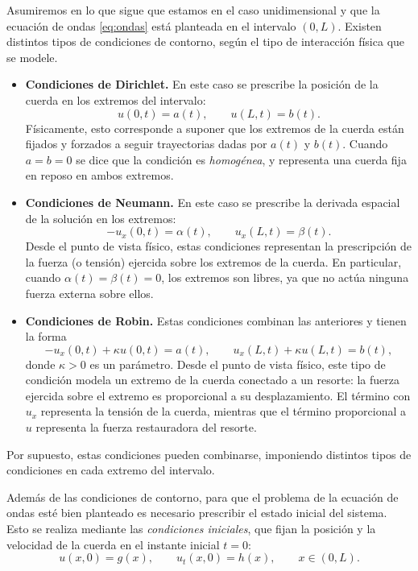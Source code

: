 \documentclass[12pt, a4paper]{amsbook}
\theoremstyle{remark}
\theoremstyle{definition}
\numberwithin{section}{chapter}
\numberwithin{subsection}{section}
\numberwithin{equation}{section}
\numberwithin{figure}{chapter}
\begin{document}
Asumiremos en lo que sigue que estamos en el caso unidimensional y que la ecuación de ondas \eqref{eq:ondas} está planteada en el intervalo $(0,L)$. Existen distintos tipos de condiciones de contorno, según el tipo de interacción física que se modele.

\begin{itemize}
\item \textbf{Condiciones de Dirichlet.}  
En este caso se prescribe la posición de la cuerda en los extremos del intervalo:
\[
u(0,t)=a(t), \qquad u(L,t)=b(t).
\]
Físicamente, esto corresponde a suponer que los extremos de la cuerda están fijados y forzados a seguir trayectorias dadas por $a(t)$ y $b(t)$.  
Cuando $a=b=0$ se dice que la condición es \emph{homogénea}, y representa una cuerda fija en reposo en ambos extremos.

\item \textbf{Condiciones de Neumann.}  
En este caso se prescribe la derivada espacial de la solución en los extremos:
\[
- u_x(0,t) = \alpha(t), \qquad u_x(L,t) = \beta(t).
\]
Desde el punto de vista físico, estas condiciones representan la prescripción de la fuerza (o tensión) ejercida sobre los extremos de la cuerda. En particular, cuando $\alpha(t)=\beta(t)=0$, los extremos son libres, ya que no actúa ninguna fuerza externa sobre ellos.

\item \textbf{Condiciones de Robin.}  
Estas condiciones combinan las anteriores y tienen la forma
\[
- u_x(0,t) + \kappa u(0,t) = a(t), \qquad 
u_x(L,t) + \kappa u(L,t) = b(t),
\]
donde $\kappa>0$ es un parámetro.  
Desde el punto de vista físico, este tipo de condición modela un extremo de la cuerda conectado a un resorte: la fuerza ejercida sobre el extremo es proporcional a su desplazamiento. El término con $u_x$ representa la tensión de la cuerda, mientras que el término proporcional a $u$ representa la fuerza restauradora del resorte.
\end{itemize}

Por supuesto, estas condiciones pueden combinarse, imponiendo distintos tipos de condiciones en cada extremo del intervalo.


Además de las condiciones de contorno, para que el problema de la ecuación de ondas esté bien planteado es necesario prescribir el estado inicial del sistema. Esto se realiza mediante las \emph{condiciones iniciales}, que fijan la posición y la velocidad de la cuerda en el instante inicial $t=0$:
\[
u(x,0)=g(x), \qquad u_t(x,0)=h(x), \qquad x\in(0,L).
\]
\end{document}
